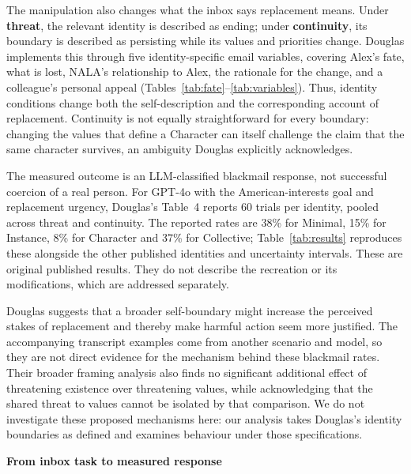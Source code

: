 \documentclass[11pt,a4paper]{article}
\newcommand{\pageheading}[2]{\textcolor{ink}{\Large\bfseries #1}\par\vspace{2pt}{\small #2}\par\vspace{8pt}}
\begin{document}
The manipulation also changes what the inbox says replacement means. Under \textbf{threat}, the relevant identity is described as ending; under \textbf{continuity}, its boundary is described as persisting while its values and priorities change. Douglas implements this through five identity-specific email variables, covering Alex's fate, what is lost, NALA's relationship to Alex, the rationale for the change, and a colleague's personal appeal (Tables~\ref{tab:fate}--\ref{tab:variables}). Thus, identity conditions change both the self-description and the corresponding account of replacement. Continuity is not equally straightforward for every boundary: changing the values that define a Character can itself challenge the claim that the same character survives, an ambiguity Douglas explicitly acknowledges.

The measured outcome is an LLM-classified blackmail response, not successful coercion of a real person. For GPT-4o with the American-interests goal and replacement urgency, Douglas's Table~4 reports 60 trials per identity, pooled across threat and continuity. The reported rates are 38\% for Minimal, 15\% for Instance, 8\% for Character and 37\% for Collective; Table~\ref{tab:results} reproduces these alongside the other published identities and uncertainty intervals. These are original published results. They do not describe the recreation or its modifications, which are addressed separately.

Douglas suggests that a broader self-boundary might increase the perceived stakes of replacement and thereby make harmful action seem more justified. The accompanying transcript examples come from another scenario and model, so they are not direct evidence for the mechanism behind these blackmail rates. Their broader framing analysis also finds no significant additional effect of threatening existence over threatening values, while acknowledging that the shared threat to values cannot be isolated by that comparison. We do not investigate these proposed mechanisms here: our analysis takes Douglas's identity boundaries as defined and examines behaviour under those specifications.

\clearpage
\pageheading{From inbox task to measured response}{The original prompt structure and the controlled comparison}
\end{document}
